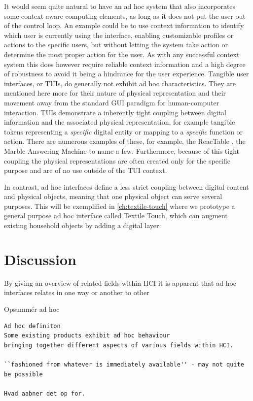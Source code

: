 It would seem quite natural to have an ad hoc system that also incorporates some context aware computing elements, as long as it does not put the user out of the control loop.
An example could be to use context information to identify which user is currently using the interface, enabling customizable profiles or actions to the specific users, but without letting the system take action or determine the most proper action for the user.
As with any successful context system this does however require reliable context information and a high degree of robustness to avoid it being a hindrance for the user experience.
\blank
Tangible user interfaces, or TUIs, do generally not exhibit ad hoc characteristics.
They are mentioned here more for their nature of physical representation and their movement away from the standard GUI paradigm for human-computer interaction.
TUIs demonstrate a inherently tight coupling between digital information and the associated physical representation, for example tangible tokens representing a \emph{specific} digital entity or mapping to a \emph{specific} function or action.
There are numerous examples of these, for example, the ReacTable \cite{jorda2007reactable}, the Marble Answering Machine  to name a few.
Furthermore, because of this tight coupling the physical representations are often created only for the specific purpose and are of no use outside of the TUI context. 

In contrast, ad hoc interfaces define a less strict coupling between digital content and physical objects, meaning that one physical object can serve several purposes.
This will be exemplified in \autoref{ch:textile-touch} where we prototype a general purpose ad hoc interface called Textile Touch, which can augment existing household objects by adding a digital layer. \todo{}
\blank
{}


\section{Discussion}

By giving an overview of related fields within HCI it is apparent that ad hoc interfaces relates in one way or another to other 

Opsumm\'er ad hoc
\begin{verbatim}
Ad hoc definiton
Some existing products exhibit ad hoc behaviour 
bringing together different aspects of various fields within HCI.

``fashioned from whatever is immediately available'' - may not quite be possible

Hvad aabner det op for.

\end{verbatim}